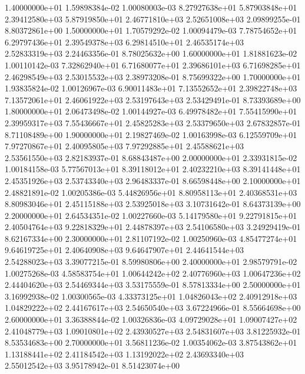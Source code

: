 \documentclass{article}
\begin{document}
\begin{center}
{   1.40000000e+01   1.59898384e-02   1.00080003e-03   8.27927638e+01   5.87903848e+01   2.39412580e+03   5.87919850e+01   2.46771810e+03   2.52651008e+03   2.09899255e-01   8.80372861e+00
   1.50000000e+01   1.70579292e-02   1.00094479e-03   7.78754652e+01   6.29797436e+01   2.39549378e+03   6.29814510e+01   2.46535174e+03   2.52833319e+03   2.24463356e-01   8.78025632e+00
   1.60000000e+01   1.81881623e-02   1.00110142e-03   7.32862940e+01   6.71680077e+01   2.39686101e+03   6.71698285e+01   2.46298549e+03   2.53015532e+03   2.38973208e-01   8.75699322e+00
   1.70000000e+01   1.93835824e-02   1.00126967e-03   6.90011483e+01   7.13552652e+01   2.39822748e+03   7.13572061e+01   2.46061922e+03   2.53197643e+03   2.53429491e-01   8.73393689e+00
   1.80000000e+01   2.06473498e-02   1.00144927e-03   6.49978482e+01   7.55415990e+01   2.39959317e+03   7.55436667e+01   2.45825283e+03   2.53379650e+03   2.67832857e-01   8.71108489e+00
   1.90000000e+01   2.19827469e-02   1.00163998e-03   6.12559709e+01   7.97270867e+01   2.40095805e+03   7.97292885e+01   2.45588621e+03   2.53561550e+03   2.82183937e-01   8.68843487e+00
   2.00000000e+01   2.33931815e-02   1.00184158e-03   5.77567013e+01   8.39118012e+01   2.40232210e+03   8.39141448e+01   2.45351926e+03   2.53743340e+03   2.96483337e-01   8.66598448e+00
   2.10000000e+01   2.48821891e-02   1.00205386e-03   5.44826956e+01   8.80958113e+01   2.40368531e+03   8.80983046e+01   2.45115188e+03   2.53925018e+03   3.10731642e-01   8.64373139e+00
   2.20000000e+01   2.64534351e-02   1.00227660e-03   5.14179580e+01   9.22791815e+01   2.40504764e+03   9.22818329e+01   2.44878397e+03   2.54106580e+03   3.24929419e-01   8.62167334e+00
   2.30000000e+01   2.81107192e-02   1.00250960e-03   4.85477274e+01   9.64619725e+01   2.40640908e+03   9.64647907e+01   2.44641544e+03   2.54288023e+03   3.39077215e-01   8.59980806e+00
   2.40000000e+01   2.98579791e-02   1.00275268e-03   4.58583754e+01   1.00644242e+02   2.40776960e+03   1.00647236e+02   2.44404620e+03   2.54469344e+03   3.53175559e-01   8.57813334e+00
   2.50000000e+01   3.16992938e-02   1.00300565e-03   4.33373125e+01   1.04826043e+02   2.40912918e+03   1.04829222e+02   2.44167617e+03   2.54650540e+03   3.67224966e-01   8.55664698e+00
   2.60000000e+01   3.36388844e-02   1.00326836e-03   4.09729028e+01   1.09007427e+02   2.41048779e+03   1.09010801e+02   2.43930527e+03   2.54831607e+03   3.81225932e-01   8.53534683e+00
   2.70000000e+01   3.56811236e-02   1.00354062e-03   3.87543862e+01   1.13188441e+02   2.41184542e+03   1.13192022e+02   2.43693340e+03   2.55012542e+03   3.95178942e-01   8.51423074e+00
}
\end{center}
\end{document}
